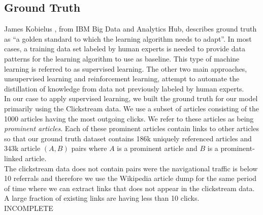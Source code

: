 \subsection{Ground Truth}

James Kobielus \cite{kobielus}, from IBM Big Data and Analytics Hub, describes ground truth as ``a golden standard to which the learning algorithm needs to adapt''. In most cases, a training data set labeled by human experts is needed to provide data patterns for the learning algorithm to use as baseline. This type of machine learning is referred to as supervised learning. The other two main approaches, unsupervised learning and reinforcement learning, attempt to automate the distillation of knowledge from data not previously labeled by human experts. \\

In our case to apply supervised learning, we built the ground truth for our model primarily using the Clickstream data. We use a subset of articles consisting of the 1000 articles having the most outgoing clicks. We refer to these articles as being \textit{prominent articles}. Each of these prominent articles contain links to other articles so that our ground truth dataset contains 186k uniquely referenced articles and 343k article  $(A,B)$ pairs where $A$ is a prominent article and $B$ is a prominent-linked article. \\

The clickstream data does not contain pairs were the navigational traffic is below 10 referrals and therefore we use the Wikipedia article dump for the same period of time where we can extract links that does not appear in the clickstream data. A large fraction of existing links are having less than 10 clicks. \\

INCOMPLETE